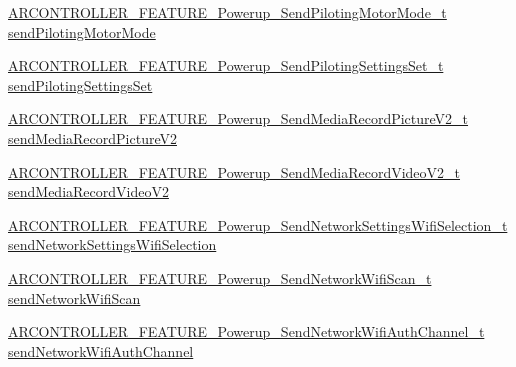 \begin{DoxyCompactItemize}
\item 
\hyperlink{_a_r_c_o_n_t_r_o_l_l_e_r___feature_8h_a1b43d5c94372a3c59a48854d38740cbd}{A\+R\+C\+O\+N\+T\+R\+O\+L\+L\+E\+R\+\_\+\+F\+E\+A\+T\+U\+R\+E\+\_\+\+Powerup\+\_\+\+Send\+Piloting\+Motor\+Mode\+\_\+t} \hyperlink{struct_a_r_c_o_n_t_r_o_l_l_e_r___f_e_a_t_u_r_e___powerup__t_a8a492f9fe39f55a6830e8ad5cad59e7c}{send\+Piloting\+Motor\+Mode}
\item 
\hyperlink{_a_r_c_o_n_t_r_o_l_l_e_r___feature_8h_a09ae5ab2fa2a93b07fe952a9c381729e}{A\+R\+C\+O\+N\+T\+R\+O\+L\+L\+E\+R\+\_\+\+F\+E\+A\+T\+U\+R\+E\+\_\+\+Powerup\+\_\+\+Send\+Piloting\+Settings\+Set\+\_\+t} \hyperlink{struct_a_r_c_o_n_t_r_o_l_l_e_r___f_e_a_t_u_r_e___powerup__t_a04cdb960428da99cf5f88db7c5d359b4}{send\+Piloting\+Settings\+Set}
\item 
\hyperlink{_a_r_c_o_n_t_r_o_l_l_e_r___feature_8h_af5f10140f9cea1f08ae920921a9774ee}{A\+R\+C\+O\+N\+T\+R\+O\+L\+L\+E\+R\+\_\+\+F\+E\+A\+T\+U\+R\+E\+\_\+\+Powerup\+\_\+\+Send\+Media\+Record\+Picture\+V2\+\_\+t} \hyperlink{struct_a_r_c_o_n_t_r_o_l_l_e_r___f_e_a_t_u_r_e___powerup__t_a86a076b465b0d6323278064c0e20fda4}{send\+Media\+Record\+Picture\+V2}
\item 
\hyperlink{_a_r_c_o_n_t_r_o_l_l_e_r___feature_8h_a6f774bbf35df06f3365316f3d6ac514d}{A\+R\+C\+O\+N\+T\+R\+O\+L\+L\+E\+R\+\_\+\+F\+E\+A\+T\+U\+R\+E\+\_\+\+Powerup\+\_\+\+Send\+Media\+Record\+Video\+V2\+\_\+t} \hyperlink{struct_a_r_c_o_n_t_r_o_l_l_e_r___f_e_a_t_u_r_e___powerup__t_adeffbb7a8f6d5a4388a1251f46e18920}{send\+Media\+Record\+Video\+V2}
\item 
\hyperlink{_a_r_c_o_n_t_r_o_l_l_e_r___feature_8h_a4b5be70a48e9d366280fe64da9959da9}{A\+R\+C\+O\+N\+T\+R\+O\+L\+L\+E\+R\+\_\+\+F\+E\+A\+T\+U\+R\+E\+\_\+\+Powerup\+\_\+\+Send\+Network\+Settings\+Wifi\+Selection\+\_\+t} \hyperlink{struct_a_r_c_o_n_t_r_o_l_l_e_r___f_e_a_t_u_r_e___powerup__t_ad4879205085cba2a55ce4459a5b8b965}{send\+Network\+Settings\+Wifi\+Selection}
\item 
\hyperlink{_a_r_c_o_n_t_r_o_l_l_e_r___feature_8h_ac5cfc4070133060147bfe744cad26bc9}{A\+R\+C\+O\+N\+T\+R\+O\+L\+L\+E\+R\+\_\+\+F\+E\+A\+T\+U\+R\+E\+\_\+\+Powerup\+\_\+\+Send\+Network\+Wifi\+Scan\+\_\+t} \hyperlink{struct_a_r_c_o_n_t_r_o_l_l_e_r___f_e_a_t_u_r_e___powerup__t_aba154dc4c835bd3e5b7588b7e6c14e86}{send\+Network\+Wifi\+Scan}
\item 
\hyperlink{_a_r_c_o_n_t_r_o_l_l_e_r___feature_8h_a00c6d805f3f3f019c877f422d86ca245}{A\+R\+C\+O\+N\+T\+R\+O\+L\+L\+E\+R\+\_\+\+F\+E\+A\+T\+U\+R\+E\+\_\+\+Powerup\+\_\+\+Send\+Network\+Wifi\+Auth\+Channel\+\_\+t} \hyperlink{struct_a_r_c_o_n_t_r_o_l_l_e_r___f_e_a_t_u_r_e___powerup__t_a24e68a1b832511e8af8c267d1f79e303}{send\+Network\+Wifi\+Auth\+Channel}

\end{DoxyCompactItemize}
